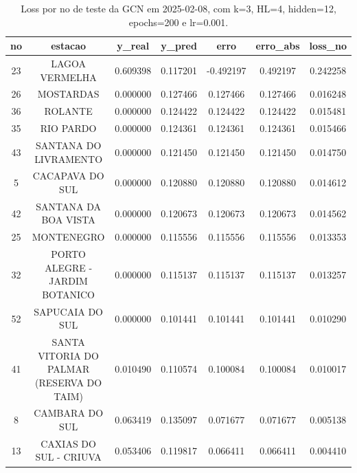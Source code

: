 \begin{table}[h]
\centering
\caption{Loss por no de teste da GCN em 2025-02-08, com k=3, HL=4, hidden=12, epochs=200 e lr=0.001.}
\label{tab:gcn_loss_k3_hl4_h12_e200_d20250208}
\begin{tabular}{ccccccc}
\toprule
no & estacao & y\_real & y\_pred & erro & erro\_abs & loss\_no \\
\midrule
23 & LAGOA VERMELHA & 0.609398 & 0.117201 & -0.492197 & 0.492197 & 0.242258 \\
26 & MOSTARDAS & 0.000000 & 0.127466 & 0.127466 & 0.127466 & 0.016248 \\
36 & ROLANTE & 0.000000 & 0.124422 & 0.124422 & 0.124422 & 0.015481 \\
35 & RIO PARDO & 0.000000 & 0.124361 & 0.124361 & 0.124361 & 0.015466 \\
43 & SANTANA DO LIVRAMENTO & 0.000000 & 0.121450 & 0.121450 & 0.121450 & 0.014750 \\
5 & CACAPAVA DO SUL & 0.000000 & 0.120880 & 0.120880 & 0.120880 & 0.014612 \\
42 & SANTANA DA BOA VISTA & 0.000000 & 0.120673 & 0.120673 & 0.120673 & 0.014562 \\
25 & MONTENEGRO & 0.000000 & 0.115556 & 0.115556 & 0.115556 & 0.013353 \\
32 & PORTO ALEGRE - JARDIM BOTANICO & 0.000000 & 0.115137 & 0.115137 & 0.115137 & 0.013257 \\
52 & SAPUCAIA DO SUL & 0.000000 & 0.101441 & 0.101441 & 0.101441 & 0.010290 \\
41 & SANTA VITORIA DO PALMAR (RESERVA DO TAIM) & 0.010490 & 0.110574 & 0.100084 & 0.100084 & 0.010017 \\
8 & CAMBARA DO SUL & 0.063419 & 0.135097 & 0.071677 & 0.071677 & 0.005138 \\
13 & CAXIAS DO SUL - CRIUVA & 0.053406 & 0.119817 & 0.066411 & 0.066411 & 0.004410 \\
\bottomrule
\end{tabular}
\end{table}
